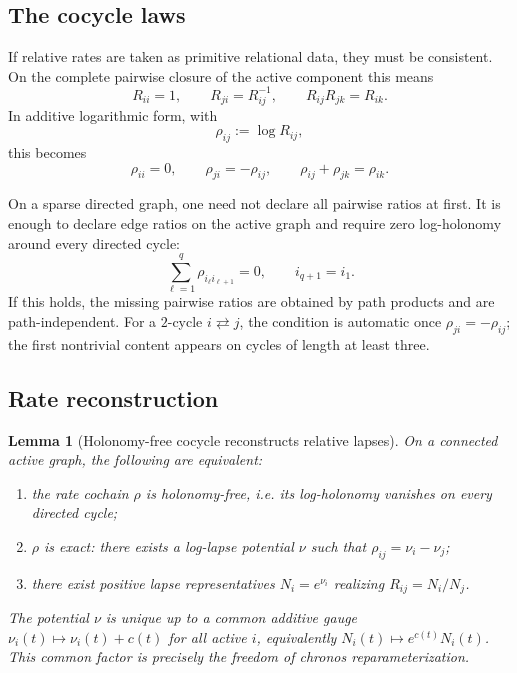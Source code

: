 \documentclass[11pt,a4paper]{article}
\theoremstyle{definition}
\theoremstyle{plain}
\newtheorem{lemma}[definition]{Lemma}
\theoremstyle{remark}
\begin{document}
\subsection{The cocycle laws}

If relative rates are taken as primitive relational data, they must be consistent.
On the complete pairwise closure of the active component this means
\[
R_{ii}=1,
\qquad
R_{ji}=R_{ij}^{-1},
\qquad
R_{ij}R_{jk}=R_{ik}.
\]
In additive logarithmic form, with
\[
\rho_{ij}:=\log R_{ij},
\]
this becomes
\[
\rho_{ii}=0,
\qquad
\rho_{ji}=-\rho_{ij},
\qquad
\rho_{ij}+\rho_{jk}=\rho_{ik}.
\]

On a sparse directed graph, one need not declare all pairwise ratios at first.
It is enough to declare edge ratios on the active graph and require zero
log-holonomy around every directed cycle:
\[
\sum_{\ell=1}^{q}
\rho_{i_\ell i_{\ell+1}}
=
0,
\qquad
i_{q+1}=i_1.
\]
If this holds, the missing pairwise ratios are obtained by path products and are
path-independent. For a \(2\)-cycle \(i\rightleftarrows j\), the condition is
automatic once \(\rho_{ji}=-\rho_{ij}\); the first nontrivial content appears on
cycles of length at least three.

\subsection{Rate reconstruction}

\begin{lemma}[Holonomy-free cocycle reconstructs relative lapses]
On a connected active graph, the following are equivalent:
\begin{enumerate}[label=\textup{(\roman*)},leftmargin=1.2cm]
    \item the rate cochain \(\rho\) is holonomy-free, i.e. its log-holonomy vanishes
    on every directed cycle;
    \item \(\rho\) is exact: there exists a log-lapse potential \(\nu\) such that
    \(\rho_{ij}=\nu_i-\nu_j\);
    \item there exist positive lapse representatives \(N_i=e^{\nu_i}\) realizing
    \(R_{ij}=N_i/N_j\).
\end{enumerate}
The potential \(\nu\) is unique up to a common additive gauge
\(\nu_i(t)\mapsto \nu_i(t)+c(t)\) for all active \(i\), equivalently
\(N_i(t)\mapsto e^{c(t)}N_i(t)\). This common factor is precisely the freedom of
chronos reparameterization.
\end{lemma}
\end{document}
